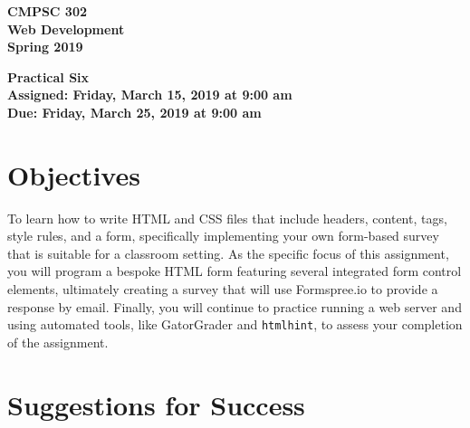 \documentclass[11pt]{article}
\newcommand{\assignmentduedate}{March 25}
\newcommand{\assignmentassignedate}{March 15}
\newcommand{\assignmentnumber}{Six}
\newcommand{\labyear}{2019}
\newcommand{\labday}{Friday}
\newcommand{\labtime}{9:00 am}
\newcommand{\assigneddate}{Assigned: \labday, \assignmentassignedate, \labyear{} at \labtime{}}
\newcommand{\duedate}{Due: \labday, \assignmentduedate, \labyear{} at \labtime{}}
\newcommand{\program}[1]{\lstinline{#1}}
\newcommand{\labtitle}[1]
{
  \begin{center}
    \begin{center}
      \bf
      CMPSC 302\\Web Development\\
      Spring 2019\\
      \medskip
    \end{center}
    \bf
    #1
  \end{center}
}
\begin{document}
\thispagestyle{empty}

\labtitle{Practical \assignmentnumber{} \\ \assigneddate{} \\ \duedate{}}

\section*{Objectives}

To learn how to write HTML and CSS files that include headers, content, tags,
style rules, and a form, specifically implementing your own form-based survey
that is suitable for a classroom setting. As the specific focus of this
assignment, you will program a bespoke HTML form featuring several integrated
form control elements, ultimately creating a survey that will use Formspree.io
to provide a response by email. Finally, you will continue to practice running a
web server and using automated tools, like GatorGrader and \program{htmlhint},
to assess your completion of the assignment.

\section*{Suggestions for Success}
\end{document}
